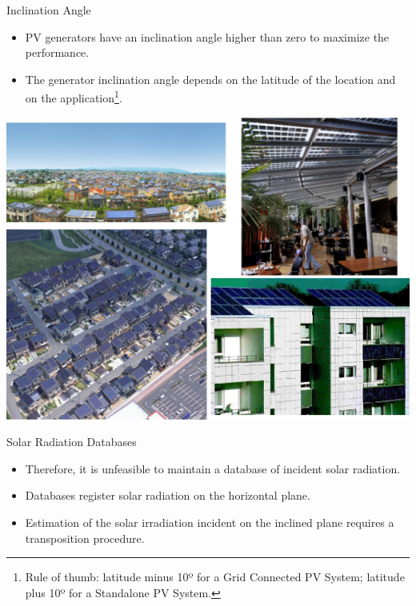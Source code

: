 \documentclass[xcolor={usenames,svgnames,dvipsnames}]{beamer}
\begin{document}
\begin{frame}[label={sec:org46f3af5}]{Inclination Angle}
\begin{itemize}
\item PV generators have an \alert{inclination angle higher than zero} to maximize the performance.
\item The generator inclination angle depends on the latitude of the location and on the application\footnote{Rule of thumb: latitude minus 10º for a Grid Connected PV System; latitude plus 10º for a Standalone PV System.}.
\end{itemize}

\begin{center}
\includegraphics[height=0.5\textheight]{../figs/PVUrban.png}
\end{center}
\end{frame}

\begin{frame}[label={sec:org13a8db6}]{Solar Radiation Databases}
\begin{itemize}
\item Therefore, it is unfeasible to maintain a database of incident solar radiation.
\item Databases register solar radiation on the horizontal plane.
\item Estimation of the solar irradiation \alert{incident on the inclined plane} requires a transposition procedure.
\end{itemize}
\end{frame}
\end{document}
